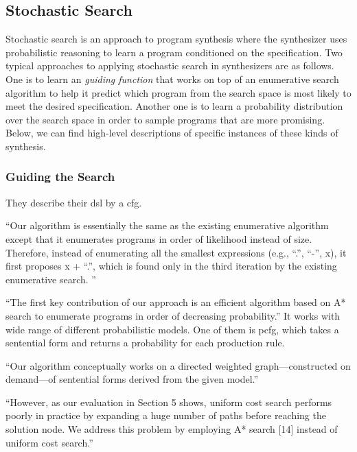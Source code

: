 \subsection{Stochastic Search}
\label{sec:stochastic-search}

Stochastic search is an approach to program synthesis where the synthesizer uses
probabilistic reasoning to learn a program conditioned on the specification. Two
typical approaches to applying stochastic search in synthesizers are as follows.
One is to learn an \textit{guiding function} that works on top of an enumerative
search algorithm to help it predict which program from the search space is most
likely to meet the desired specification. Another one is to learn a probability
distribution over the search space in order to sample programs that are more
promising. Below, we can find high-level descriptions of specific instances of
these kinds of synthesis.


\subsubsection{Guiding the Search}
\label{sec:guiding-the-search}

They describe their \gls{dsl} by a \gls{cfg}.

``Our algorithm is essentially the same as the existing enumerative algorithm
except that it enumerates programs in order of likelihood instead of size.
Therefore, instead of enumerating all the smallest expressions (e.g., “.”, “-”,
x), it first proposes x + “.”, which is found only in the third iteration by the
existing enumerative search. ''

``The first key contribution of our approach is an efficient algorithm based on
A* search to enumerate programs in order of decreasing probability.''
It works with wide range of different probabilistic models. One of them is pcfg,
which takes a sentential form and returns a probability for each production rule.

``Our algorithm conceptually works on a directed weighted graph—constructed on
demand—of sentential forms derived from the given model.''

``However, as our evaluation in Section 5 shows, uniform cost search performs
poorly in practice by expanding a huge number of paths before reaching the
solution node. We address this problem by employing A* search [14] instead of
uniform cost search.''

